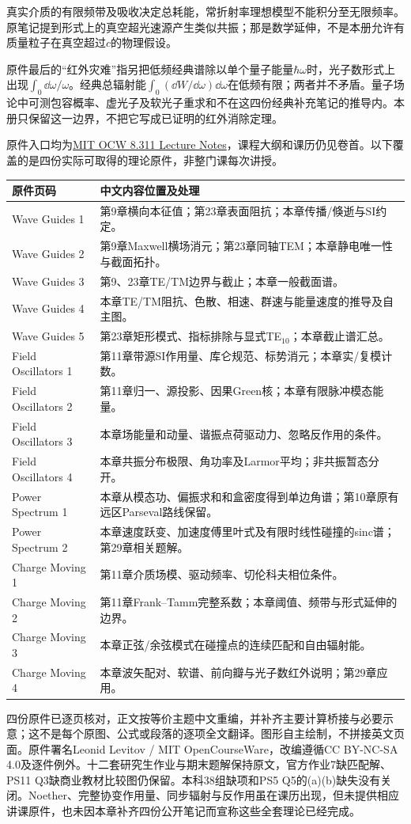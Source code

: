 真实介质的有限频带及吸收决定总耗能，常折射率理想模型不能积分至无限频率。原笔记提到形式上的真空超光速源产生类似共振；那是数学延伸，不是本册允许有质量粒子在真空超过$c$的物理假设。

原件最后的“红外灾难”指另把低频经典谱除以单个量子能量$\hbar\omega$时，光子数形式上出现$\int_0\dd\omega/\omega$。经典总辐射能$\int_0(\dd W/\dd\omega)\dd\omega$在低频有限；两者并不矛盾。量子场论中可测包容概率、虚光子及软光子重求和不在这四份经典补充笔记的推导内。本册只保留这一边界，不把它写成已证明的红外消除定理。

原件入口均为\href{https://ocw.mit.edu/courses/8-311-electromagnetic-theory-spring-2004/pages/lecture-notes/}{MIT OCW 8.311 Lecture Notes}，课程大纲和课历仍见卷首。以下覆盖的是四份实际可取得的理论原件，非整门课每次讲授。
\begin{longtable}{p{}p{}}
\toprule 原件页码 & 中文内容位置及处理\\\midrule\endhead
Wave Guides 1 & 第9章横向本征值；第23章表面阻抗；本章传播/倏逝与SI约定。\\
Wave Guides 2 & 第9章Maxwell横场消元；第23章同轴TEM；本章静电唯一性与截面拓扑。\\
Wave Guides 3 & 第9、23章TE/TM边界与截止；本章一般截面谱。\\
Wave Guides 4 & 本章TE/TM阻抗、色散、相速、群速与能量速度的推导及自主图。\\
Wave Guides 5 & 第23章矩形模式、指标排除与显式TE$_{10}$；本章截止谱汇总。\\
Field Oscillators 1 & 第11章带源SI作用量、库仑规范、标势消元；本章实/复模计数。\\
Field Oscillators 2 & 第11章归一、源投影、因果Green核；本章有限脉冲模态能量。\\
Field Oscillators 3 & 本章场能量和动量、谐振点荷驱动力、忽略反作用的条件。\\
Field Oscillators 4 & 本章共振分布极限、角功率及Larmor平均；非共振暂态分开。\\
Power Spectrum 1 & 本章从模态功、偏振求和和盒密度得到单边角谱；第10章原有远区Parseval路线保留。\\
Power Spectrum 2 & 本章速度跃变、加速度傅里叶式及有限时线性碰撞的sinc谱；第29章相关题解。\\
Charge Moving 1 & 第11章介质场模、驱动频率、切伦科夫相位条件。\\
Charge Moving 2 & 第11章Frank--Tamm完整系数；本章阈值、频带与形式延伸的边界。\\
Charge Moving 3 & 本章正弦/余弦模式在碰撞点的连续匹配和自由辐射能。\\
Charge Moving 4 & 本章波矢配对、软谱、前向瓣与光子数红外说明；第29章应用。\\
\bottomrule
\end{longtable}

四份原件已逐页核对，正文按等价主题中文重编，并补齐主要计算桥接与必要示意；这不是每个原图、公式或段落的逐项全文翻译。图形自主绘制，不拼接英文页面。原件署名Leonid Levitov / MIT OpenCourseWare，改编遵循CC BY-NC-SA 4.0及逐件例外。十二套研究生作业与期末题解保持原文，官方作业7缺匹配解、PS11 Q3缺商业教材比较图仍保留。本科38组缺项和PS5 Q5的(a)(b)缺失没有关闭。Noether、完整协变作用量、同步辐射与反作用虽在课历出现，但未提供相应讲课原件，也未因本章补齐四份公开笔记而宣称这些全套理论已经完成。

